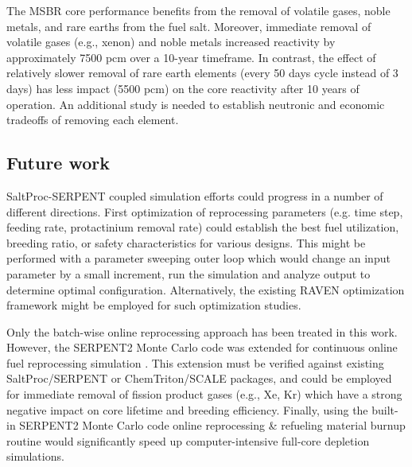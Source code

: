 The \gls{MSBR} core performance benefits from the removal of volatile gases, 
noble metals, and rare earths from the fuel salt. 
Moreover, immediate removal of volatile gases (e.g., xenon) and noble metals 
increased reactivity by approximately 7500 pcm over a 10-year 
timeframe. In contrast, the effect of relatively slower removal of rare earth 
elements (every 50 days cycle instead of 3 days) has less impact (5500 pcm) on 
the core reactivity after 10 years of operation. An additional study 
is needed to establish neutronic  and economic tradeoffs of removing each element.

\subsection{Future work}
SaltProc-SERPENT coupled simulation efforts could progress in a 
number of different directions. First optimization of reprocessing parameters (e.g. time step, feeding rate, 
protactinium removal rate) could establish the best fuel utilization, breeding 
ratio, or safety characteristics for various designs. This might be performed with a parameter sweeping 
outer loop which would change an input parameter by a small increment, run the 
simulation and analyze output to determine optimal configuration. Alternatively, 
the existing RAVEN optimization framework \cite{alfonsi_raven_2013} might be 
employed for such optimization studies.

Only the batch-wise online reprocessing approach has been treated in this 
work. However, the SERPENT2 Monte Carlo code was extended for 
continuous online fuel reprocessing simulation \cite{aufiero_extended_2013}. 
This extension must be verified against existing SaltProc/SERPENT or 
ChemTriton/SCALE packages, and could be employed for immediate removal of 
fission product gases (e.g., Xe, Kr) which have a strong negative impact on 
core lifetime and breeding efficiency. Finally, using the built-in SERPENT2 
Monte Carlo code online reprocessing \& refueling material burnup routine would 
significantly speed up computer-intensive full-core depletion simulations.
